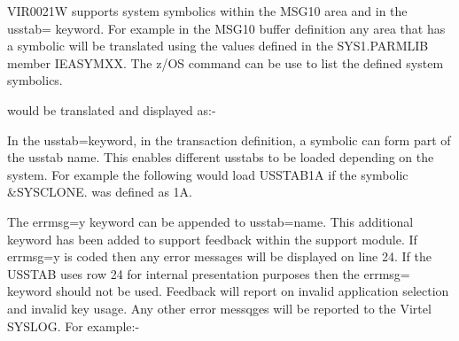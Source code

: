 \documentclass[letterpaper,10pt,english]{sphinxmanual}
\begin{document}
VIR0021W supports system symbolics within the MSG10 area and in the usstab= keyword. For example in the MSG10 buffer definition any area that has a symbolic will be translated using the values defined in the SYS1.PARMLIB member IEASYMXX. The z/OS command  can be use to list the defined system symbolics.

\begin{sphinxVerbatim}[commandchars=\\\{\}]
 
\end{sphinxVerbatim}

would be translated and displayed as:-

\begin{sphinxVerbatim}[commandchars=\\\{\}]
 
\end{sphinxVerbatim}

In the usstab=keyword, in the transaction definition, a symbolic can form part of the usstab name. This enables different usstabs to be loaded depending on the system. For example the following would load USSTAB1A if the symbolic \&SYSCLONE. was defined as 1A.

\begin{sphinxVerbatim}[commandchars=\\\{\}]
\end{sphinxVerbatim}


The errmsg=y keyword can be appended to usstab=name. This additional keyword has been added to support feedback within the support module. If errmsg=y is coded then any error messages will be displayed on line 24. If the USSTAB uses row 24 for internal presentation purposes then the errmsg= keyword should not be used. Feedback will report on invalid application selection and invalid key usage. Any other error messqges will be reported to the Virtel SYSLOG. For example:-

\begin{sphinxVerbatim}[commandchars=\\\{\}]
\end{sphinxVerbatim}
\end{document}

